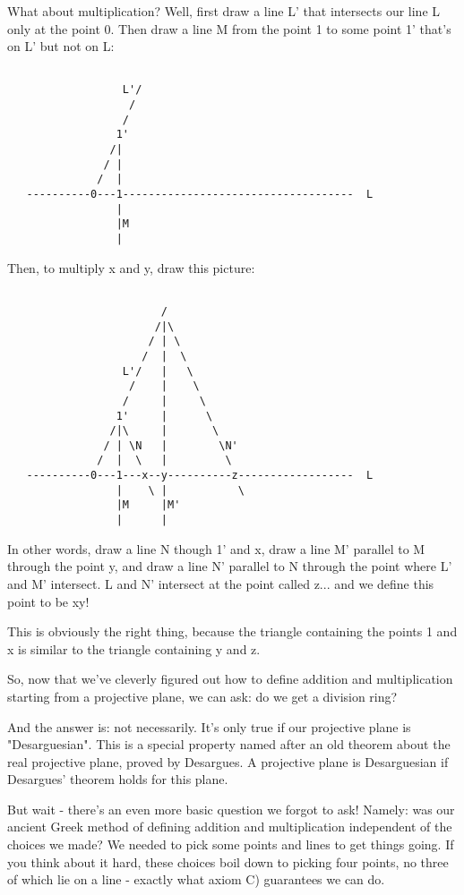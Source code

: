 What about multiplication?  Well, first draw a line L' that intersects
our line L only at the point 0.  Then draw a line M from the point 1 to
some point 1' that's on L' but not on L:


\begin{verbatim}

                  L'/
                   / 
                  /
                 1'
                /|
               / |
              /  |
   ----------0---1------------------------------------  L
                 |
                 |M
                 |
\end{verbatim}
    
Then, to multiply x and y, draw this picture:

\begin{verbatim}

                        /
                       /|\   
                      / | \
                     /  |  \
                  L'/   |   \
                   /    |    \
                  /     |     \
                 1'     |      \
                /|\     |       \
               / | \N   |        \N'
              /  |  \   |         \
   ----------0---1---x--y----------z------------------  L
                 |    \ |           \
                 |M     |M'
                 |      |
\end{verbatim}
    
In other words, draw a line N though 1' and x, draw a line M' parallel
to M through the point y, and draw a line N' parallel to N through the
point where L' and M' intersect.  L and N' intersect at the point called
z... and we define this point to be xy!

This is obviously the right thing, because the triangle containing
the points 1 and x is similar to the triangle containing y and z.  

So, now that we've cleverly figured out how to define addition and
multiplication starting from a projective plane, we can ask: do we
get a division ring?  

And the answer is: not necessarily.   It's only true if our projective
plane is "Desarguesian".  This is a special property named after an 
old theorem about the real projective plane, proved by Desargues.
A projective plane is Desarguesian if Desargues' theorem holds for
this plane.

But wait - there's an even more basic question we forgot to ask! 
Namely: was our ancient Greek method of defining addition and
multiplication independent of the choices we made?  We needed to pick
some points and lines to get things going.  If you think about it hard,
these choices boil down to picking four points, no three of which lie on
a line - exactly what axiom C) guarantees we can do.   

